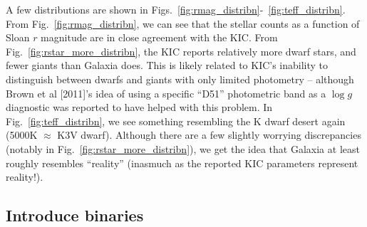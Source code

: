 \documentclass{emulateapj}
\begin{document}
A few distributions are shown in 
Figs.~\ref{fig:rmag_distribn}-~\ref{fig:teff_distribn}.
From Fig.~\ref{fig:rmag_distribn}, we can see that the stellar counts as a 
function of Sloan $r$ magnitude are in close agreement with the KIC.
From Fig.~\ref{fig:rstar_more_distribn}, the KIC reports relatively more dwarf 
stars, and fewer giants than Galaxia does.
This is likely related to KIC's inability to distinguish between dwarfs and 
giants with only limited photometry -- although Brown et al [2011]'s idea of 
using a specific ``D51'' photometric band as a $\log g$ diagnostic was reported 
to have helped with this problem.
In Fig.~\ref{fig:teff_distribn}, we see something resembling the K dwarf desert 
again (5000K $\approx$ K3V dwarf).
Although there are a few slightly worrying discrepancies (notably in 
Fig.~\ref{fig:rstar_more_distribn}), we get the idea that Galaxia at least 
roughly resembles ``reality'' (inasmuch as the reported KIC parameters 
represent reality!).

\subsection{Introduce binaries}
\label{subsec:introduce_binaries}
\end{document}
